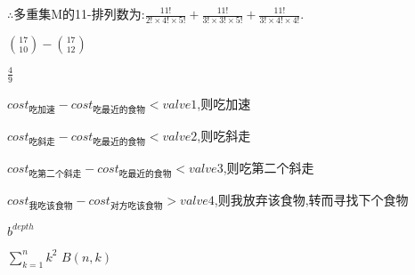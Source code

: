 \documentclass[a4paper]{ctexart}
\begin{document}
	$\therefore{}$多重集M的11-排列数为:$\frac{11!}{2!\times{}4!\times{}5!}+\frac{11!}{3!\times{}3!\times{}5!}+\frac{11!}{3!\times{}4!\times{}4!}$.\par
	$\binom{17}{10}-\binom{17}{12}$\par
	$\frac{4}{9}$\par
	$cost_{\mbox{吃加速}}-cost_{\mbox{吃最近的食物}} < valve1$,则吃加速\par
	$cost_{\mbox{吃斜走}}-cost_{\mbox{吃最近的食物}} < valve2$,则吃斜走\par
	$cost_{\mbox{吃第二个斜走}}-cost_{\mbox{吃最近的食物}} < valve3$,则吃第二个斜走\par
	$cost_{\mbox{我吃该食物}}-cost_{\mbox{对方吃该食物}} > valve4$,则我放弃该食物,转而寻找下个食物\par
	$b^{depth}$\par
	$\sum_{k=1}^{n}k^2$
	$B(n,k)$
\end{document}
